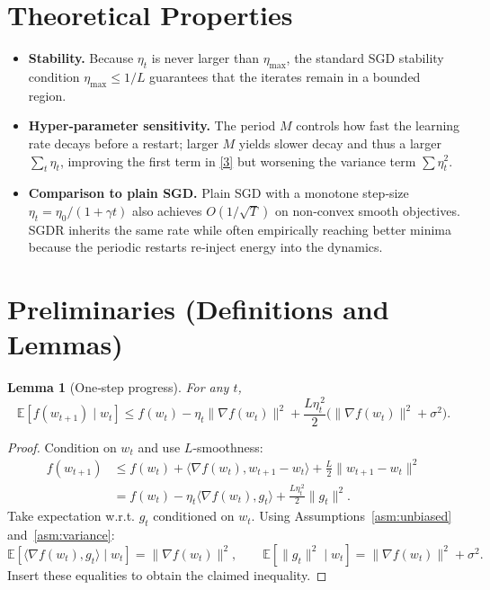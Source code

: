 \documentclass{article}
\newtheorem{lemma}{Lemma}
\begin{document}
\section*{Theoretical Properties}
\begin{itemize}
  \item \textbf{Stability.}  Because $\eta_t$ is never larger than $\eta_{\max}$,
        the standard SGD stability condition $\eta_{\max}\le 1/L$ guarantees that
        the iterates remain in a bounded region.
  \item \textbf{Hyper‑parameter sensitivity.}
        The period $M$ controls how fast the learning rate decays before a
        restart; larger $M$ yields slower decay and thus a larger
        $\sum_{t}\eta_t$, improving the first term in \eqref{3} but worsening the
        variance term $\sum\eta_t^{2}$.
  \item \textbf{Comparison to plain SGD.}
        Plain SGD with a monotone step‑size $\eta_t=\eta_0/(1+\gamma t)$ also
        achieves $O(1/\sqrt{T})$ on non‑convex smooth objectives.
        SGDR inherits the same rate while often empirically reaching better
        minima because the periodic restarts re‑inject energy into the
        dynamics.
\end{itemize}

\section*{Preliminaries (Definitions and Lemmas)}
\begin{lemma}[One‑step progress]\label{lem:one-step}
For any $t$,
\[
\mathbb{E}\!\left[f(w_{t+1})\mid w_t\right]
\le
f(w_t)-\eta_t\|\nabla f(w_t)\|^2
+\frac{L\eta_t^{\,2}}{2}\bigl(\|\nabla f(w_t)\|^2+\sigma^2\bigr).
\]
\end{lemma}
\begin{proof}
Condition on $w_t$ and use $L$‑smoothness:
\[
\begin{aligned}
f(w_{t+1})
&\le f(w_t)+\langle\nabla f(w_t),w_{t+1}-w_t\rangle
      +\frac{L}{2}\|w_{t+1}-w_t\|^2 \\[2mm]
&= f(w_t)-\eta_t\langle\nabla f(w_t),g_t\rangle
      +\frac{L\eta_t^{\,2}}{2}\|g_t\|^2 .
\end{aligned}
\]
Take expectation w.r.t. $g_t$ conditioned on $w_t$.
Using Assumptions~\ref{asm:unbiased} and~\ref{asm:variance}:
\[
\mathbb{E}[\langle\nabla f(w_t),g_t\rangle\mid w_t]
 =\|\nabla f(w_t)\|^2,
\qquad
\mathbb{E}[\|g_t\|^2\mid w_t]
 =\|\nabla f(w_t)\|^2+\sigma^2 .
\]
Insert these equalities to obtain the claimed inequality.
\end{proof}
\end{document}

